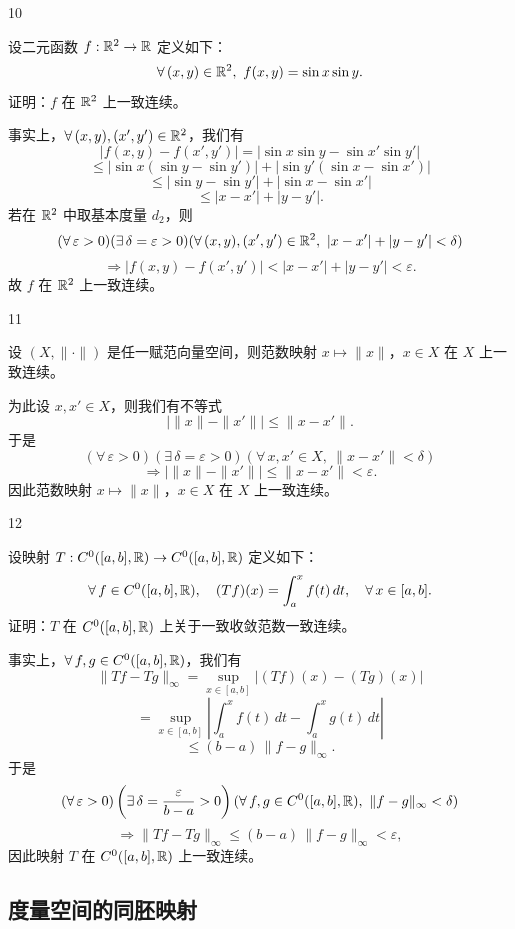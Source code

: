 \begin{sourceexample}{10}

设二元函数 $f:\mathbb{R}^2\to\mathbb{R}$ 定义如下：
\[\forall\,(x,y)\in\mathbb{R}^2,\ f(x,y)=\sin x\sin y.\]
证明：$f$ 在 $\mathbb{R}^2$ 上一致连续。

事实上，$\forall\,(x,y),(x',y')\in\mathbb{R}^2$，我们有
\[|f(x,y)-f(x',y')|=|\sin x\sin y-\sin x'\sin y'|\]
\[\leqslant|\sin x(\sin y-\sin y')|+|\sin y'(\sin x-\sin x')|\]
\[\leqslant|\sin y-\sin y'|+|\sin x-\sin x'|\]
\[\leqslant|x-x'|+|y-y'|.\]
若在 $\mathbb{R}^2$ 中取基本度量 $d_2$，则
\[(\forall\,\varepsilon>0)(\exists\,\delta=\varepsilon>0)(\forall\,(x,y),(x',y')\in\R^2,\ |x-x'|+|y-y'|<\delta)\]
\[\Longrightarrow|f(x,y)-f(x',y')|<|x-x'|+|y-y'|<\varepsilon.\]
故 $f$ 在 $\mathbb{R}^2$ 上一致连续。

\end{sourceexample}

\begin{sourceexample}{11}

设 $(X,\|\cdot\|)$ 是任一赋范向量空间，则范数映射 $x\longmapsto\|x\|$，$x\in X$ 在 $X$ 上一致连续。

为此设 $x,x'\in X$，则我们有不等式
\[\bigl|\|x\|-\|x'\|\bigr|\leqslant\|x-x'\|.\]
于是
\[(\forall\,\varepsilon>0)(\exists\,\delta=\varepsilon>0)(\forall\,x,x'\in X,\ \|x-x'\|<\delta)\]
\[\Longrightarrow\bigl|\|x\|-\|x'\|\bigr|\leqslant\|x-x'\|<\varepsilon.\]
因此范数映射 $x\longmapsto\|x\|$，$x\in X$ 在 $X$ 上一致连续。

\end{sourceexample}

\begin{sourceexample}{12}

设映射 $T:C^0([a,b],\mathbb{R})\to C^0([a,b],\mathbb{R})$ 定义如下：
\[\forall\,f\in C^0([a,b],\mathbb{R}),\quad (Tf)(x)=\int_a^xf(t)\,dt,\quad\forall\,x\in[a,b].\]
证明：$T$ 在 $C^0([a,b],\mathbb{R})$ 上关于一致收敛范数一致连续。

事实上，$\forall\,f,g\in C^0([a,b],\mathbb{R})$，我们有
\[\|Tf-Tg\|_{\infty}=\sup_{x\in[a,b]}|(Tf)(x)-(Tg)(x)|\]
\[=\sup_{x\in[a,b]}\left|\int_a^xf(t)\,dt-\int_a^xg(t)\,dt\right|\]
\[\leqslant(b-a)\,\|f-g\|_{\infty}.\]
于是
\[(\forall\,\varepsilon>0)\left(\exists\,\delta=\frac{\varepsilon}{b-a}>0\right)(\forall\,f,g\in C^0([a,b],\mathbb{R}),\ \|f-g\|_{\infty}<\delta)\]
\[\Longrightarrow\|Tf-Tg\|_{\infty}\leqslant(b-a)\,\|f-g\|_{\infty}<\varepsilon,\]
因此映射 $T$ 在 $C^0([a,b],\mathbb{R})$ 上一致连续。

\end{sourceexample}

\subsection{度量空间的同胚映射}


